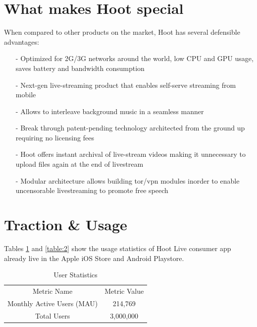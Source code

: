 \documentclass{article}
\begin{document}
\section{What makes Hoot special}
When compared to other products on the market, Hoot has several defensible advantages:
\begin{itemize}
\item[-]Optimized for 2G/3G networks around the world, low CPU and GPU usage, saves battery and bandwidth consumption
\item[-]Next-gen live-streaming product that enables self-serve streaming from mobile
\item[-]Allows to interleave background music in a seamless manner
\item[-]Break through patent-pending technology architected from the
  ground up requiring no licensing fees
\item[-]Hoot offers instant archival of live-stream videos making it unnecessary to upload files again at the end of livestream
\item[-]Modular architecture allows building tor/vpn modules inorder
  to enable uncensorable livestreaming to promote free speech
\end{itemize}


\section{Traction \& Usage}


Tables \ref{table:1} and \ref{table:2} show the usage statistics of Hoot Live consumer app already live in the Apple iOS Store and Android Playstore.

\setlength{\arrayrulewidth}{1mm}
\setlength{\tabcolsep}{18pt}
\renewcommand{\arraystretch}{2.5} 
 


\begin{table}[!htb]
\centering
\begin{tabular}{ |c|c| }
\hline
\rowcolor{lightgray} \multicolumn{2}{|c|}{User Statistics} \\
\hline
Metric Name & Metric Value  \\
\hline
Monthly Active Users (MAU) & 214,769 \\
Total Users & 3,000,000  \\
\hline
\end{tabular}
\caption{User Statistics}
\label{table:1}
\end{table}
\end{document}
